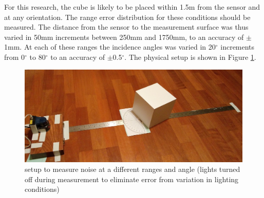 	For this research, the cube is likely to be placed within 1.5m from the sensor and at any orientation. The range error distribution for these conditions should be measured. The distance from the sensor to the measurement surface was thus varied in 50mm increments between 250mm and 1750mm, to an accuracy of $\pm$1mm. At each of these ranges the incidence angles was varied in 20$^\circ$ increments from 0$^\circ$ to 80$^\circ$ to an accuracy of $\pm$0.5$^\circ$. The physical setup is shown in Figure \ref{fig:noise_setup}.
	
	\begin{figure}
	\centering
	 	\includegraphics[width=1\textwidth,trim = 0mm 0mm 0mm 0mm,clip=true]{./Figures/noise_setup}\vspace*{0ex}
	  	\caption{setup to measure noise at a different ranges and angle (lights turned off during measurement to eliminate error from variation in lighting conditions)} \label{fig:noise_setup}
	\end{figure}
		 
